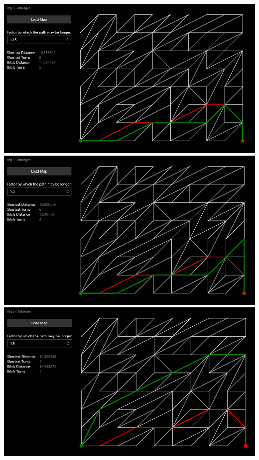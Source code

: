 \documentclass{article}
\theoremstyle{nonumberplain}
\begin{document}
\begin{center}
\includegraphics{examples/2_15.png}
\includegraphics{examples/2_30.png}
\includegraphics{examples/2_50.png}
\end{center}

\subsection{}
\end{document}
